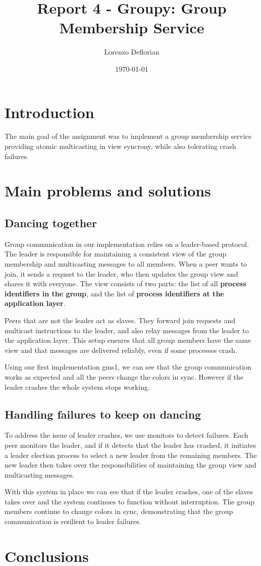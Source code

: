 \documentclass[a4paper, 11pt]{article}
\title{Report 4 - Groupy: Group Membership Service}
\author{Lorenzo Deflorian}
\date{\today{}}
\begin{document}
\maketitle

\section{Introduction}
The main goal of the assignment was to implement a group membership service providing atomic multicasting in view syncrony, while also tolerating crash failures.

\section{Main problems and solutions}
\subsection{Dancing together}
Group communication in our implementation relies on a leader-based protocol. The leader is responsible for maintaining a consistent view of the group membership and multicasting messages to all members. When a peer wants to join, it sends a request to the leader, who then updates the group view and shares it with everyone. The view consists of two parts: the list of all \textbf{process identifiers in the group}, and the list of \textbf{process identifiers at the application layer}.

Peers that are not the leader act as slaves. They forward join requests and multicast instructions to the leader, and also relay messages from the leader to the application layer. This setup ensures that all group members have the same view and that messages are delivered reliably, even if some processes crash.

Using our first implementation gms1, we can see that the group communication works as expected and all the peers change the colors in sync. However if the leader crashes the whole system stops working.

\subsection{Handling failures to keep on dancing}
To address the issue of leader crashes, we use monitors to detect failures. Each peer monitors the leader, and if it detects that the leader has crashed, it initiates a leader election process to select a new leader from the remaining members. The new leader then takes over the responsibilities of maintaining the group view and multicasting messages.

With this system in place we can see that if the leader crashes, one of the slaves takes over and the system continues to function without interruption. The group members continue to change colors in sync, demonstrating that the group communication is resilient to leader failures.

\section{Conclusions}
\end{document}
